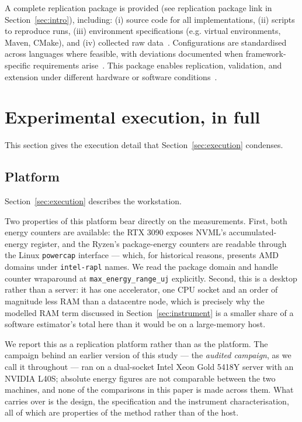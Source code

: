 A complete replication package is provided (see replication package link in Section~\ref{sec:intro}), including: (i) source code for all implementations, (ii) scripts to reproduce runs, (iii) environment specifications (e.g. virtual environments, Maven, CMake), and (iv) collected raw data~\citep{cruz2025greening,verdecchia2023systematic}.
Configurations are standardised across languages where feasible, with deviations documented when framework-specific requirements arise~\citep{pereira2021ranking,gordillo2024ranking}.
This package enables replication, validation, and extension under different hardware or software conditions~\citep{feldt2010validity,sjoberg2023construct}.

\section{Experimental execution, in full}
\label{app:execution}

This section gives the execution detail that Section~\ref{sec:execution}
condenses.

\subsection{Platform}
\label{app:platform}

Section~\ref{sec:execution} describes the workstation.

Two properties of this platform bear directly on the measurements. First, both
energy counters are available: the RTX 3090 exposes NVML's accumulated-energy
register, and the Ryzen's package-energy counters are readable through the Linux
\texttt{powercap} interface --- which, for historical reasons, presents AMD
domains under \texttt{intel-rapl} names. We read the package domain and handle
counter wraparound at \texttt{max\_energy\_range\_uj} explicitly. Second, this is
a desktop rather than a server: it has one accelerator, one CPU socket and an
order of magnitude less RAM than a datacentre node, which is precisely why the
modelled RAM term discussed in Section~\ref{sec:instrument} is a smaller share
of a software estimator's total here than it would be on a large-memory host.

We report this as a replication platform rather than as the platform. The
campaign behind an earlier version of this study --- the \emph{audited
campaign}, as we call it throughout --- ran on a dual-socket Intel Xeon Gold 5418Y server
with an NVIDIA L40S; absolute energy figures are not comparable between the two
machines, and none of the comparisons in this paper is made across them. What
carries over is the design, the specification and the instrument
characterisation, all of which are properties of the method rather than of the
host.

